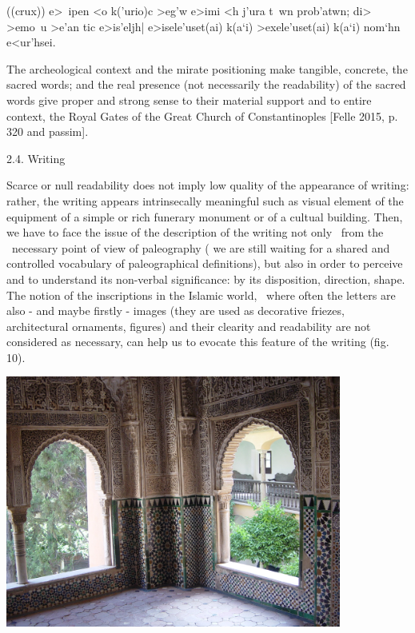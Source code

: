 \documentclass[amsthm,ebook]{saparticle}
\begin{document}
((crux)) \textgreek{e>~ipen <o k('urio)c {\textbar} >eg'w e>imi {\textbar} <h j'ura t~wn {\textbar} prob'atwn;
{\textbar} di> >emo~u {\textbar}{\textbar} >e'an tic {\textbar} e>is'eljh| {\textbar} e>isele'uset(ai) {\textbar}
k(a`i) >exele'uset(ai) {\textbar} k(a`i) nom`hn {\textbar} e<ur'hsei.}


\bigskip

The archeological context and the mirate positioning make tangible, concrete, the sacred words; and the real presence
(not necessarily the readability) of the sacred words give proper and strong sense to their material support and to
entire context, the Royal Gates of the Great Church of Constantinoples [Felle 2015, p. 320 and passim].


\bigskip

2.4. Writing 

Scarce or null readability does not imply low quality of the appearance of writing: rather, the writing appears
intrinsecally meaningful such as visual element of the equipment of a simple or rich funerary monument or of a cultual
building. Then, we have to face the issue of the description of the writing not only \ from the \ necessary point of
view of paleography ( we are still waiting for a shared and controlled vocabulary of paleographical definitions), but
also in order to perceive and to understand its non-verbal significance: by its disposition, direction, shape. The
notion of the inscriptions in the Islamic world, \ where often the letters are also - and maybe firstly - images (they
are used as decorative friezes, architectural ornaments, figures) and their clearity and readability are not considered
as necessary, can help us to evocate this feature of the writing (fig. 10).


\bigskip

 \includegraphics[width=11.044cm,height=8.281cm]{FelleVisualFeaturesofinscriptionsEAGLE2016FullPaper-img014.jpg} 
\end{document}

